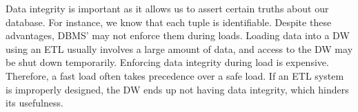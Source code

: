 Data integrity is important as it allows us to assert certain truths about our database. For instance, we know that each tuple is identifiable. Despite these advantages, DBMS' may not enforce them during loads. Loading data into a DW using an ETL usually involves a large amount of data, and access to the DW may be shut down temporarily. Enforcing data integrity during load is expensive. Therefore, a fast load often takes precedence over a safe load. If an ETL system is improperly designed, the DW ends up not having data integrity, which hinders its usefulness.






